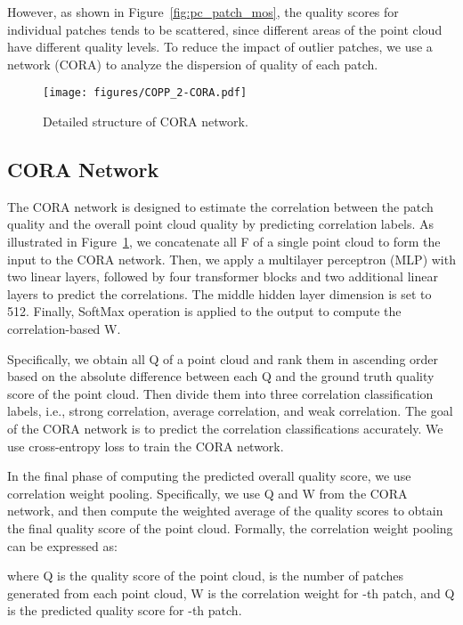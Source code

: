 \documentclass[conference]{IEEEtran}
\begin{document}
However, as shown in Figure~\ref{fig:pc_patch_mos}, the quality scores for individual patches tends to be scattered, since different areas of the point cloud have different quality levels. To reduce the impact of outlier patches, we use a network (CORA) to analyze the dispersion of quality of each patch.




\begin{figure}[t]             \begin{center}
    \texttt{[image: figures/COPP\_2-CORA.pdf]}
\end{center}
\vspace{-0.1cm}
   \caption{Detailed structure of CORA network.}
\label{fig:CORA}
\end{figure}




\subsection{CORA Network}
The CORA network is designed to estimate the correlation between the patch quality and the overall point cloud quality by predicting correlation labels. As illustrated in Figure~\ref{fig:CORA}, we concatenate all F of a single point cloud to form the input to the CORA network. Then, we apply a multilayer perceptron (MLP) with two linear layers, followed by four transformer blocks and two additional linear layers to predict the correlations. The middle hidden layer dimension is set to 512. Finally, SoftMax operation is applied to the output to compute the correlation-based W.

Specifically, we obtain all Q of a point cloud and rank them in ascending order based on the absolute difference between each Q and the ground truth quality score of the point cloud.
Then divide them into three correlation classification labels, i.e., strong correlation, average correlation, and weak correlation. The goal of the CORA network is to predict the correlation classifications accurately. We use cross-entropy loss to train the CORA network.

In the final phase of computing the predicted overall quality score, we use correlation weight pooling. Specifically, we use Q and W from the CORA network, and then compute the weighted average of the quality scores to obtain the final quality score of the point cloud. Formally, the correlation weight pooling can be expressed as:


where Q is the quality score of the point cloud,  is the number of patches generated from each point cloud, W is the correlation weight for -th patch, and Q is the predicted quality score for -th patch.
\end{document}

